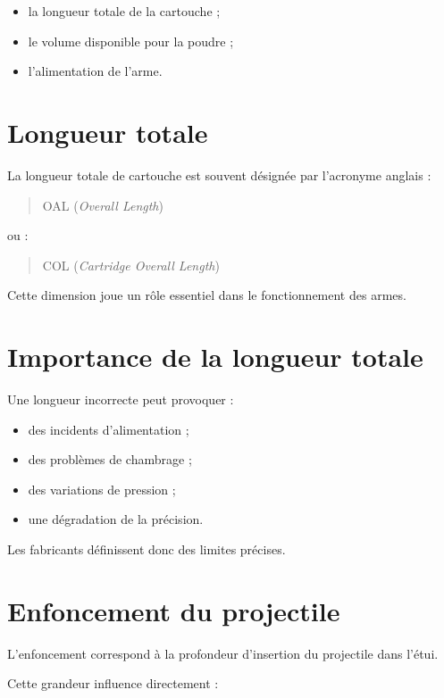\begin{itemize}
    \item la longueur totale de la cartouche ;
    \item le volume disponible pour la poudre ;
    \item l'alimentation de l'arme.
\end{itemize}

\section{Longueur totale}

La longueur totale de cartouche est souvent désignée par l'acronyme anglais :

\begin{quote}
OAL (\emph{Overall Length})
\end{quote}

ou :

\begin{quote}
COL (\emph{Cartridge Overall Length})
\end{quote}

Cette dimension joue un rôle essentiel dans le fonctionnement des armes.

\section{Importance de la longueur totale}

Une longueur incorrecte peut provoquer :

\begin{itemize}
    \item des incidents d'alimentation ;
    \item des problèmes de chambrage ;
    \item des variations de pression ;
    \item une dégradation de la précision.
\end{itemize}

Les fabricants définissent donc des limites précises.

\section{Enfoncement du projectile}

L'enfoncement correspond à la profondeur d'insertion du projectile dans
l'étui.

Cette grandeur influence directement :

